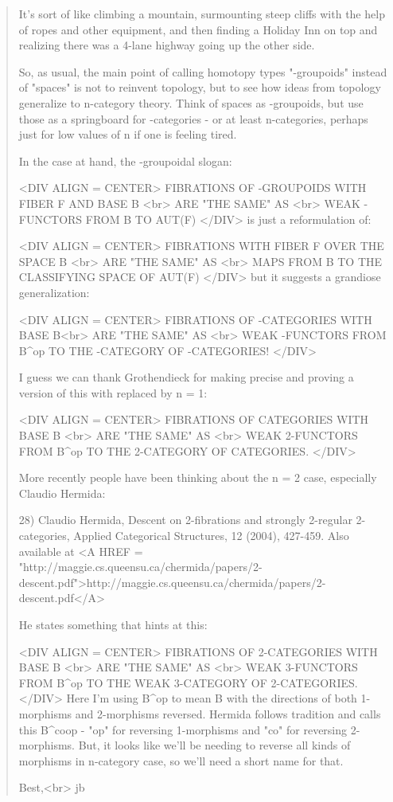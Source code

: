 \begin{quote}
 It's sort of like climbing a mountain, surmounting steep cliffs with
 the help of ropes and other equipment, and then finding a Holiday Inn 
 on top and realizing there was a 4-lane highway going up the other side.  
 
 So, as usual, the main point of calling homotopy types 
 "\omega -groupoids"
 instead of "spaces" 
 is not to reinvent topology, but to see how ideas
 from topology generalize to n-category theory.  Think of spaces as 
 \omega -groupoids, but use those as a springboard for \omega -categories -
 or at least n-categories, perhaps just for low values of n if one is 
 feeling tired.

 In the case at hand, the \omega -groupoidal slogan: 

<DIV ALIGN = CENTER>
               FIBRATIONS OF \omega -GROUPOIDS WITH FIBER F AND BASE B <br>
                               ARE "THE SAME" AS <br>
                       WEAK \omega -FUNCTORS FROM B TO AUT(F)
</DIV>
 is just a reformulation of:

<DIV ALIGN = CENTER>
                  FIBRATIONS WITH FIBER F OVER THE SPACE B <br>
                             ARE "THE SAME" AS <br>
                 MAPS FROM B TO THE CLASSIFYING SPACE OF AUT(F)
</DIV>
 but it suggests a grandiose generalization:

<DIV ALIGN = CENTER>
               FIBRATIONS OF \omega -CATEGORIES WITH BASE B<br>
                            ARE "THE SAME" AS <br>
   WEAK \omega -FUNCTORS FROM B^{op} TO THE \omega -CATEGORY OF \omega -CATEGORIES!
</DIV>

 I guess we can thank Grothendieck for making precise and proving a
 version of this with \omega  replaced by n = 1:

<DIV ALIGN = CENTER>
                      FIBRATIONS OF CATEGORIES WITH BASE B <br>
                               ARE "THE SAME" AS <br>
            WEAK 2-FUNCTORS FROM B^{op} TO THE 2-CATEGORY OF CATEGORIES.
</DIV>

 More recently people have been thinking about the n = 2 case, especially
 Claudio Hermida:

 28) Claudio Hermida, Descent on 2-fibrations and strongly 2-regular 
 2-categories, Applied Categorical Structures, 12 (2004), 427-459.
 Also available at <A HREF = "http://maggie.cs.queensu.ca/chermida/papers/2-descent.pdf">http://maggie.cs.queensu.ca/chermida/papers/2-descent.pdf</A>

 He states something that hints at this:

<DIV ALIGN = CENTER>
                      FIBRATIONS OF 2-CATEGORIES WITH BASE B <br>
                               ARE "THE SAME" AS <br>
         WEAK 3-FUNCTORS FROM B^{op} TO THE WEAK 3-CATEGORY OF 2-CATEGORIES.
</DIV>
 Here I'm using B^{op} to mean B with the directions of 
 both 1-morphisms and 2-morphisms reversed.  
 Hermida follows tradition and calls this B^{coop} - 
 "op" for reversing 
 1-morphisms and "co" for reversing 2-morphisms.  
 But, it looks like we'll 
 be needing to reverse all kinds of morphisms in n-category case, so we'll 
 need a short name for that.

 Best,<br>
 jb
\end{quote}

